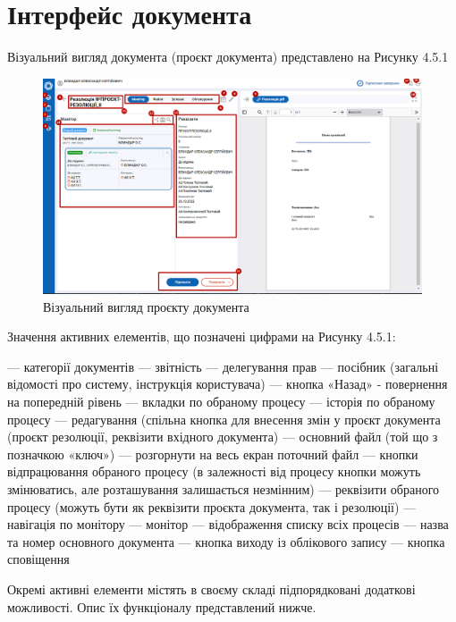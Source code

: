 \section{Інтерфейс документа}

Візуальний вигляд документа (проєкт документа) представлено на Рисунку 4.5.1

\begin{figure}[!htbp]
\centerline{\includegraphics[width=\textwidth]{img/4.5.1.png}}
\caption{Візуальний вигляд проєкту документа}
\end{figure}

Значення активних елементів, що позначені цифрами на Рисунку 4.5.1:

 --- категорії документів
 --- звітність
 --- делегування прав
 --- посібник (загальні відомості про систему, інструкція користувача)
 --- кнопка «Назад» - повернення на попередній рівень
 --- вкладки по обраному процесу
 --- історія по обраному процесу
 --- редагування (спільна кнопка для внесення змін у проєкт документа (проєкт резолюції, реквізити вхідного документа)
 --- основний файл (той що з позначкою «ключ»)
 --- розгорнути на весь екран поточний файл
 --- кнопки відпрацювання обраного процесу (в залежності від процесу кнопки можуть змінюватись, але розташування залишається незмінним)
 --- реквізити обраного процесу (можуть бути як реквізити проєкта документа, так і резолюції)
 --- навігація по монітору
 --- монітор --- відображення списку всіх процесів
 --- назва та номер основного документа
 --- кнопка виходу із облікового запису
 --- кнопка сповіщення

Окремі активні елементи містять в своєму складі підпорядковані додаткові
можливості. Опис їх функціоналу представлений нижче.

